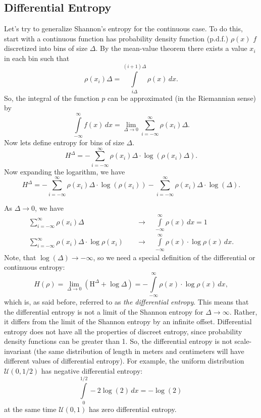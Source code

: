 \documentclass[12pt,sans]{article}
\theoremstyle{definition}
\theoremstyle{plain}
\theoremstyle{remark}
\begin{document}
\subsection{Differential Entropy}
Let's try to generalize Shannon's entropy for the continuous case.
To do this, start with a continuous function
has probability density function (p.d.f.) $\rho(x)$
$f$ discretized into bins of size $\Delta$.
By the mean-value theorem there exists a value $x_i$ in each bin such that
\[
\rho(x_i) \Delta = \int\limits_{i\Delta}^{(i + 1)\Delta} \rho(x)\, dx.
\]
So, the integral of the function $p$ can be approximated (in the Riemannian sense) by
\[
\int\limits_{-\infty }^{\infty }f(x)\,dx =
\lim_{\Delta \to 0}\sum_{i=-\infty}^{\infty} \rho(x_i)\Delta.
\]
Now lets define entropy for bins of size $\Delta$.
\[
H^\Delta = -\sum_{i=-\infty}^{\infty} \rho(x_i) \Delta\cdot \log (\rho(x_i)\Delta).
\]
Now expanding the logarithm, we have
\[
H^\Delta =
    -\sum_{i=-\infty}^{\infty} \rho(x_i)\Delta\cdot \log(\rho(x_i))
    -\sum_{i=-\infty}^{\infty} \rho(x_i)\Delta\cdot \log(\Delta).
\]

As $\Delta\to 0$, we have
\[
\begin{aligned}
    \sum_{i=-\infty}^{\infty} \rho(x_i) \Delta\quad &\to \quad\int\limits_{-\infty}^{\infty} \rho(x)\,dx=1\\
    \sum_{i=-\infty}^{\infty} \rho(x_i) \Delta\cdot \log\rho(x_i)\quad&\to \quad\int\limits_{-\infty}^{\infty} \rho(x)\cdot\log \rho(x)\,dx.
\end{aligned}
\]
Note, that $\log(\Delta) \to -\infty$, so we need a special definition of the differential or continuous entropy:
\[
H(\rho) = \lim_{\Delta \to 0}\left(\mathrm {H}^\Delta+\log \Delta \right)=-\int\limits_{-\infty}^{\infty} \rho(x)\cdot\log \rho(x)\,dx,
\]
which is, as said before, referred to as \emph{the differential entropy}. This means that the differential entropy is not a limit of the Shannon entropy for $\Delta\to\infty$. Rather, it differs from the limit of the Shannon entropy by an infinite offset.
Differential entropy does not have all the properties of discreet entropy, since probability density functions can be greater than 1.
So, the differential entropy is not scale-invariant (the same distribution of length in meters and centimeters will have different values of differential entropy).
For example, the uniform distribution $\mathcal{U}(0,1/2)$ has negative differential entropy:
$$\int\limits_{0}^{1/2}-2\log(2)\,dx=-\log(2)\,$$
at the same time $\mathcal{U}(0,1)$ has zero differential entropy.
\end{document}
